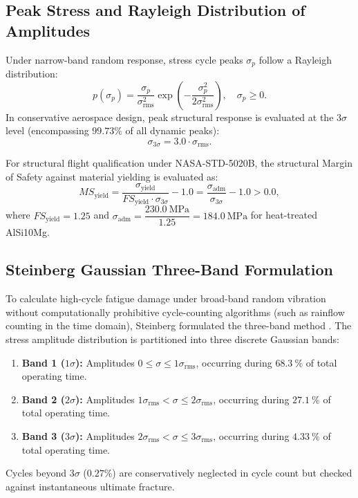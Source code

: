 \subsection{Peak Stress and Rayleigh Distribution of Amplitudes}

Under narrow-band random response, stress cycle peaks $\sigma_p$ follow a Rayleigh distribution:
\begin{equation}
p(\sigma_p) = \frac{\sigma_p}{\sigma_{\text{rms}}^2} \exp\left(-\frac{\sigma_p^2}{2\sigma_{\text{rms}}^2}\right), \quad \sigma_p \ge 0.
\label{eq:rayleigh_peaks}
\end{equation}
In conservative aerospace design, peak structural response is evaluated at the $3\sigma$ level (encompassing $99.73\%$ of all dynamic peaks):
\begin{equation}
\sigma_{3\sigma} = 3.0 \cdot \sigma_{\text{rms}}.
\label{eq:three_sigma_def}
\end{equation}

For structural flight qualification under NASA-STD-5020B, the structural Margin of Safety against material yielding is evaluated as:
\begin{equation}
MS_{\text{yield}} = \frac{\sigma_{\text{yield}}}{FS_{\text{yield}} \cdot \sigma_{3\sigma}} - 1.0 = \frac{\sigma_{\text{adm}}}{\sigma_{3\sigma}} - 1.0 > 0.0,
\label{eq:ms_yield_definition}
\end{equation}
where $FS_{\text{yield}} = 1.25$ and $\sigma_{\text{adm}} = \dfrac{\SI{230.0}{\mega\pascal}}{1.25} = \SI{184.0}{\mega\pascal}$ for heat-treated AlSi10Mg.

\subsection{Steinberg Gaussian Three-Band Formulation}

To calculate high-cycle fatigue damage under broad-band random vibration without computationally prohibitive cycle-counting algorithms (such as rainflow counting in the time domain), Steinberg formulated the three-band method \cite{steinberg2000}. The stress amplitude distribution is partitioned into three discrete Gaussian bands:
\begin{enumerate}
\item \textbf{Band 1 ($1\sigma$):} Amplitudes $0 \le \sigma \le 1\sigma_{\text{rms}}$, occurring during $\SI{68.3}{\percent}$ of total operating time.
\item \textbf{Band 2 ($2\sigma$):} Amplitudes $1\sigma_{\text{rms}} < \sigma \le 2\sigma_{\text{rms}}$, occurring during $\SI{27.1}{\percent}$ of total operating time.
\item \textbf{Band 3 ($3\sigma$):} Amplitudes $2\sigma_{\text{rms}} < \sigma \le 3\sigma_{\text{rms}}$, occurring during $\SI{4.33}{\percent}$ of total operating time.
\end{enumerate}
Cycles beyond $3\sigma$ ($0.27\%$) are conservatively neglected in cycle count but checked against instantaneous ultimate fracture.

